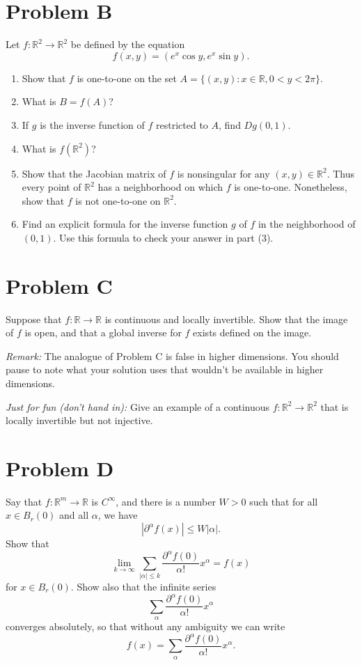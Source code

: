 \documentclass[lang=cn,11pt]{template}
\begin{document}
\section*{Problem B}
Let $f : \mathbb{R}^2 \to \mathbb{R}^2$ be defined by the equation
\[
f(x, y) = (e^x \cos y, e^x \sin y).
\]
\begin{enumerate}
    \item Show that $f$ is one-to-one on the set $A = \{(x, y) : x \in \mathbb{R}, 0 < y < 2\pi\}$.
    \item What is $B = f(A)$?
    \item If $g$ is the inverse function of $f$ restricted to $A$, find $Dg(0, 1)$.
    \item What is $f(\mathbb{R}^2)$?
    \item Show that the Jacobian matrix of $f$ is nonsingular for any $(x, y) \in \mathbb{R}^2$. Thus every point of $\mathbb{R}^2$ has a neighborhood on which $f$ is one-to-one. Nonetheless, show that $f$ is not one-to-one on $\mathbb{R}^2$.
    \item Find an explicit formula for the inverse function $g$ of $f$ in the neighborhood of $(0, 1)$. Use this formula to check your answer in part (3).
\end{enumerate}


\section*{Problem C}
Suppose that $f : \mathbb{R} \to \mathbb{R}$ is continuous and locally invertible. Show that the image of $f$ is open, and that a global inverse for $f$ exists defined on the image.

\textit{Remark:} The analogue of Problem C is false in higher dimensions. You should pause to note what your solution uses that wouldn’t be available in higher dimensions.

\textit{Just for fun (don’t hand in):} Give an example of a continuous $f : \mathbb{R}^2 \to \mathbb{R}^2$ that is locally invertible but not injective.

\section*{Problem D}
Say that $f : \mathbb{R}^m \to \mathbb{R}$ is $C^\infty$, and there is a number $W > 0$ such that for all $x \in B_r(0)$ and all $\alpha$, we have
\[
|\partial^\alpha f(x)| \leq W |\alpha|.
\]
Show that
\[
\lim_{k \to \infty} \sum_{|\alpha| \leq k} \frac{\partial^\alpha f(0)}{\alpha!} x^\alpha = f(x)
\]
for $x \in B_r(0)$. Show also that the infinite series
\[
\sum_{\alpha} \frac{\partial^\alpha f(0)}{\alpha!} x^\alpha
\]
converges absolutely, so that without any ambiguity we can write
\[
f(x) = \sum_{\alpha} \frac{\partial^\alpha f(0)}{\alpha!} x^\alpha.
\]
\end{document}
